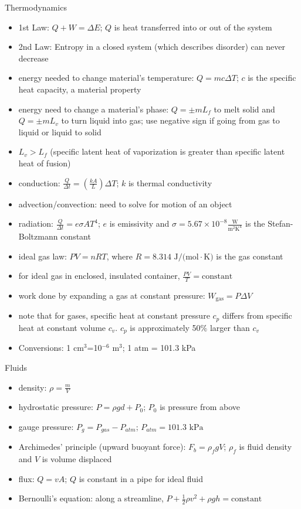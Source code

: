 \documentclass[11pt,letterpaper]{article}
\begin{document}
Thermodynamics
\begin{itemize}
\item 1st Law: $Q+W=\Delta{E}$; $Q$ is heat transferred into or out of the system
\item 2nd Law: Entropy in a closed system (which describes disorder) can never decrease
\item energy needed to change material's temperature: $Q=mc\Delta{T}$; $c$ is the specific heat capacity, a material property
\item energy need to change a material's phase: $Q=\pm mL_f$ to melt solid and $Q=\pm mL_v$ to turn liquid into gas; use negative sign if going from gas to liquid or liquid to solid
\item $L_v>L_f$ (specific latent heat of vaporization is greater than specific latent heat of fusion)
\item conduction: $\frac{Q}{\Delta{t}}=\left(\frac{kA}{L}\right)\Delta{T}$; $k$ is thermal conductivity
\item advection/convection: need to solve for motion of an object
\item radiation: $\frac{Q}{\Delta{t}}=e\sigma{A}T^4$; $e$ is emissivity and $\sigma=5.67\times{10}^{-8}\frac{\mbox{W}}{\mbox{m}^2\mbox{K}^4}$ is the Stefan-Boltzmann constant
\item ideal gas law: $PV=nRT$, where $R=8.314\mbox{ J/(mol}\cdot\mbox{K)}$ is the gas constant
\item for ideal gas in enclosed, insulated container, $\frac{PV}{T}=\mbox{constant}$
\item work done by expanding a gas at constant pressure: $W_{\mathrm{gas}}=P\Delta{V}$
\item note that for gases, specific heat at constant pressure $c_p$ differs from specific heat at constant volume $c_v$. $c_p$ is approximately 50$\%$ larger than $c_v$
\item Conversions: 1 cm$^3$=10$^{-6}$ m$^3$; 1 atm = 101.3 kPa
\end{itemize}
Fluids
\begin{itemize}
\item density: $\rho=\frac{m}{V}$
\item hydrostatic pressure: $P=\rho{g}d+P_0$; $P_0$ is pressure from above
\item gauge pressure: $P_g=P_{gas}-P_{atm}$; $P_{atm}=101.3\mbox{ kPa}$
\item Archimedes' principle (upward buoyant force): $F_b=\rho_f{g}V$; $\rho_f$ is fluid density and $V$ is volume displaced
\item flux: $Q=vA$; $Q$ is constant in a pipe for ideal fluid
\item Bernoulli's equation: along a streamline, $P+\frac{1}{2}\rho{v^2}+\rho{g}h=\mathrm{constant}$
\end{itemize}
\end{document}
